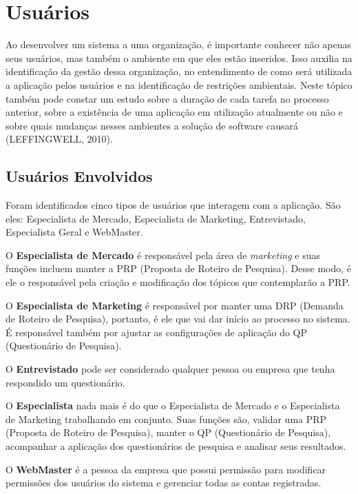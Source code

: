 \section{Usuários}
	Ao desenvolver um sistema a uma organização, é importante conhecer não apenas seus usuários, mas também o ambiente em que eles estão inseridos. Isso auxilia na identificação da gestão dessa organização, no entendimento de como será utilizada a aplicação pelos usuários e na identificação de restrições ambientais. Neste tópico também pode constar um estudo sobre a duração de cada tarefa no processo anterior, sobre a existência de uma aplicação em utilização atualmente ou não e sobre quais mudanças nesses ambientes a solução de software causará (LEFFINGWELL, 2010).

	\subsection{Usuários Envolvidos}
		Foram identificados cinco tipos de usuários que interagem com a aplicação. São eles: Especialista de Mercado, Especialista de Marketing, Entrevistado, Especialista Geral e WebMaster.


		\begin{itemize}
		{

			\item O \textbf{Especialista de Mercado} é responsável pela área de \textit{marketing} e suas funções incluem manter a PRP (Proposta de Roteiro de Pesquisa). Desse modo, é ele o responsável pela criação e modificação dos tópicos que contemplarão a PRP.
			
			\item O \textbf{Especialista de Marketing} é responsável por manter uma DRP (Demanda de Roteiro de Pesquisa), portanto, é ele que vai dar início ao processo no sistema. É responsável também por ajustar as configurações de aplicação do QP (Questionário de Pesquisa).
			
			\item O \textbf{Entrevistado} pode ser considerado qualquer pessoa ou empresa que tenha respondido um questionário.
			
			\item O \textbf{Especialista} nada mais é do que o Especialista de Mercado e o Especialista de Marketing trabalhando em conjunto. Suas funções são, validar uma PRP (Proposta de Roteiro de Pesquisa), manter o QP (Questionário de Pesquisa), acompanhar a aplicação dos questionários de pesquisa e analisar seus resultados.
			
			\item O \textbf{WebMaster} é a pessoa da empresa que possui permissão para modificar permissões dos usuários do sistema e gerenciar todas as contas registradas.

		}
		\end{itemize}